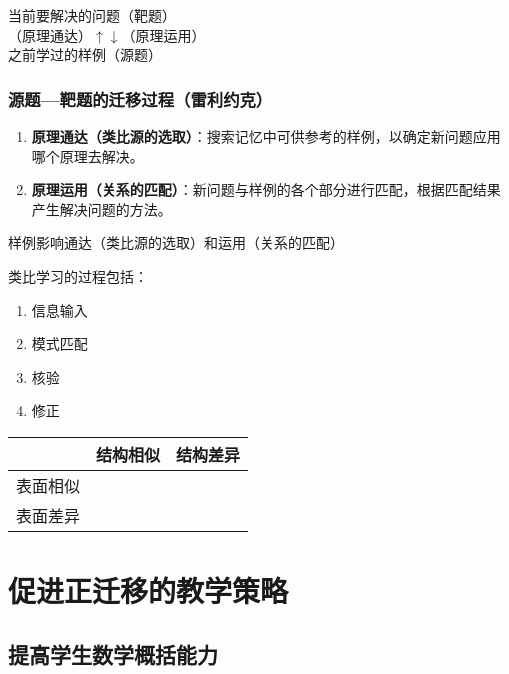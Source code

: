 \begin{center}
当前要解决的问题（靶题）\\
（原理通达）$\uparrow$$\downarrow$（原理运用）\\
之前学过的样例（源题）
\end{center}

\subsubsection*{源题—靶题的迁移过程（雷利约克）}
\begin{enumerate}
    \item \textbf{原理通达（类比源的选取）}：搜索记忆中可供参考的样例，以确定新问题应用哪个原理去解决。
    \item \textbf{原理运用（关系的匹配）}：新问题与样例的各个部分进行匹配，根据匹配结果产生解决问题的方法。
\end{enumerate}

样例影响通达（类比源的选取）和运用（关系的匹配）


类比学习的过程包括：
\begin{enumerate}
    \item 信息输入
    \item 模式匹配
    \item 核验
    \item 修正
\end{enumerate}


\begin{tabular}{c|cc}
        & 结构相似 & 结构差异  \\
\hline
表面相似 &   &    \\
表面差异 &       &      \\
\end{tabular}

\clearpage

\section{促进正迁移的教学策略}

\subsection{提高学生数学概括能力}


